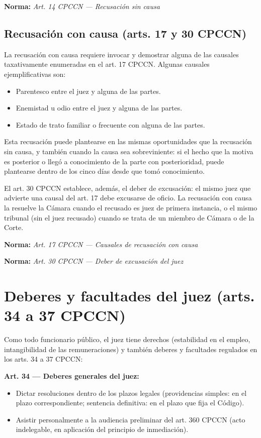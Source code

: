 \documentclass[12pt,oneside]{book}
\newcommand{\norma}[1]{%
\par\noindent\textbf{Norma:} \textit{#1}\par\smallskip
}
\begin{document}
\norma{Art. 14 CPCCN --- Recusación sin causa}

\subsection{Recusación con causa (arts. 17 y 30 CPCCN)}

La recusación con causa requiere invocar y demostrar alguna de las causales taxativamente enumeradas en el art. 17 CPCCN. Algunas causales ejemplificativas son:

\begin{itemize}
    \item Parentesco entre el juez y alguna de las partes.
    \item Enemistad u odio entre el juez y alguna de las partes.
    \item Estado de trato familiar o frecuente con alguna de las partes.
\end{itemize}

Esta recusación puede plantearse en las mismas oportunidades que la recusación sin causa, y también cuando la causa sea sobreviniente: si el hecho que la motiva es posterior o llegó a conocimiento de la parte con posterioridad, puede plantearse dentro de los cinco días desde que tomó conocimiento.

\begin{important}
El art. 30 CPCCN establece, además, el deber de excusación: el mismo juez que advierte una causal del art. 17 debe excusarse de oficio. La recusación con causa la resuelve la Cámara cuando el recusado es juez de primera instancia, o el mismo tribunal (sin el juez recusado) cuando se trata de un miembro de Cámara o de la Corte.
\end{important}

\norma{Art. 17 CPCCN --- Causales de recusación con causa}
\norma{Art. 30 CPCCN --- Deber de excusación del juez}

\section{Deberes y facultades del juez (arts. 34 a 37 CPCCN)}

Como todo funcionario público, el juez tiene derechos (estabilidad en el empleo, intangibilidad de las remuneraciones) y también deberes y facultades regulados en los arts. 34 a 37 CPCCN:

\textbf{Art. 34 --- Deberes generales del juez:}
\begin{itemize}
    \item Dictar resoluciones dentro de los plazos legales (providencias simples: en el plazo correspondiente; sentencia definitiva: en el plazo que fija el Código).
    \item Asistir personalmente a la audiencia preliminar del art. 360 CPCCN (acto indelegable, en aplicación del principio de inmediación).
\end{itemize}
\end{document}

